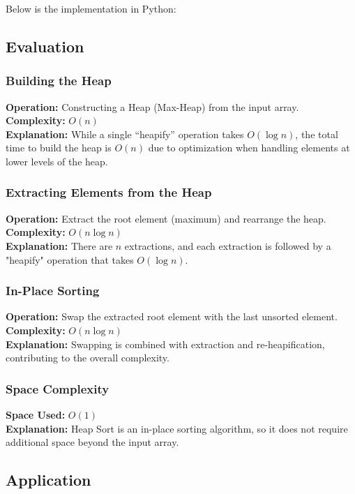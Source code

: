 Below is the implementation in Python:


\subsection{Evaluation}

\subsubsection{Building the Heap}
\textbf{Operation:} Constructing a Heap (Max-Heap) from the input array. \\
\textbf{Complexity:} $O(n)$ \\
\textbf{Explanation:} While a single “heapify” operation takes $O(\log n)$, the total time to build the heap is $O(n)$ due to optimization when handling elements at lower levels of the heap.

\subsubsection{Extracting Elements from the Heap}
\textbf{Operation:} Extract the root element (maximum) and rearrange the heap. \\
\textbf{Complexity:} $O(n \log n)$ \\
\textbf{Explanation:} There are $n$ extractions, and each extraction is followed by a "heapify" operation that takes $O(\log n)$.

\subsubsection{In-Place Sorting}
\textbf{Operation:} Swap the extracted root element with the last unsorted element. \\
\textbf{Complexity:} $O(n \log n)$ \\
\textbf{Explanation:} Swapping is combined with extraction and re-heapification, contributing to the overall complexity.

\subsubsection{Space Complexity}
\textbf{Space Used:} $O(1)$ \\
\textbf{Explanation:} Heap Sort is an in-place sorting algorithm, so it does not require additional space beyond the input array.

\subsection{Application}

